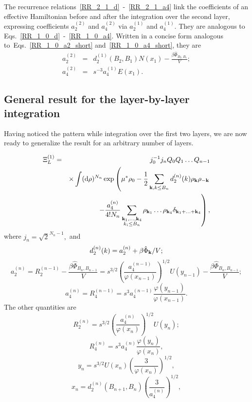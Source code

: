 The recurrence relations~\eqref{RR_2_1_d}~-~\eqref{RR_2_1_a4} link the coefficients of an effective Hamiltonian before and after the integration over the second layer, expressing coefficients $a_2^{(2)}$ and $a_4^{(2)}$ via $a_2^{(1)}$ and $a_4^{(1)}$. They are analogous to Eqs.~\eqref{RR_1_0_d}~-~\eqref{RR_1_0_a4}. Written in a concise form analogous to~Eqs.~\eqref{RR_1_0_a2_short} and~\eqref{RR_1_0_a4_short}, they are
\begin{eqnarray}
	a_2^{(2)} & = & d_2^{(1)}(B_2, B_1) N(x_1) - \frac{\beta\hat{\Phi}_{B_2, B_1}}{V};
	\\
	a_4^{(2)} & = & s^{-3} a_4^{(1)} E(x_1).
\end{eqnarray}

\subsection{General result for the layer-by-layer integration}
Having noticed the pattern while integration over the first two layers, we are now ready to generalize the result for an arbitrary number of layers.

\begin{eqnarray}
	\Xi_L^{(1)} & = & j_0^{-1}j_n Q_0 Q_1 \dotsc Q_{n-1} 
	\\
	&& \times 
	\int ({\rm d} \rho)^{N_n} \exp
	\left(
	\mu^*\rho_0 - \frac{1}{2} \sum_{\vb k, k \leq B_n} d_2^{(n)}(k) \rho_{\vb k} \rho_{-\vb k}
	\right.
	\nonumber \\
	&& 
	\left.
	- \frac{a_4^{(n)}}{4!N_n} \sum_{\substack{\vb k_1, \dotsc, \vb k_4 \\ k_i \leq B_n}}
	\rho_{\vb k_1} \dotsc \rho_{\vb k_4} \delta_{\vb{k}_1 + \dotsc + \vb{k}_4}
	\right)
	\nonumber ,
\end{eqnarray}
where $j_n = \sqrt{2}^{N_n - 1},$ and
\begin{equation}
	\label{RR_n_d}
	d_2^{(n)}(k) = a_2^{(n)} + \beta\hat{\Phi}_{\vb k} / V;
\end{equation}
\begin{equation}
	\label{RR_n_a2}
	a_2^{(n)} = R_2^{(n-1)} - \frac{\beta\hat{\Phi}_{B_n, B_{n-1}}}{V} = s^{3/2} \left(\frac{a_4^{(n-1)}}{\varphi(x_{n-1})}\right)^{1/2} U(y_{n-1})
	- \frac{\beta\hat{\Phi}_{B_n, B_{n-1}}}{V};
\end{equation}
\begin{equation}
	\label{RR_n_a4}
	a_4^{(n)} = R_4^{(n-1)} = s^3 a_4^{(n-1)} \frac{\varphi(y_{n-1})}{\varphi(x_{n-1})}.
\end{equation}
The other quantities are
\begin{equation*}
	R_2^{(n)} = s^{3/2} \left(\frac{a_4^{(n)}}{\varphi(x_n)}\right)^{1/2} U(y_n);
\end{equation*} 
\begin{equation*}
	R_4^{(n)} = s^3 a_4^{(n)} \frac{\varphi(y_n)}{\varphi(x_n)},
\end{equation*}
\begin{equation*}
	y_n = s^{3/2} U(x_n) \left(\frac{3}{\varphi(x_n)}\right)^{1/2},
\end{equation*}
\begin{equation*}
	x_n = d_2^{(n)}(B_{n+1}, B_n) \left(\frac{3}{a_4^{(n)}}\right)^{1/2},
\end{equation*}


